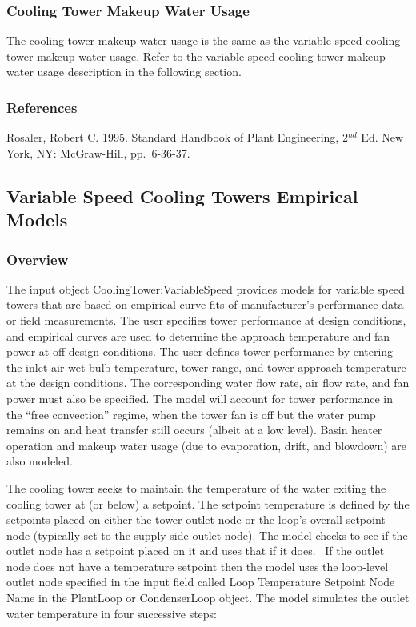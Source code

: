 \subsubsection{Cooling Tower Makeup Water Usage}\label{cooling-tower-makeup-water-usage}

The cooling tower makeup water usage is the same as the variable speed cooling tower makeup water usage. Refer to the variable speed cooling tower makeup water usage description in the following section.

\subsubsection{References}\label{references-015}

Rosaler, Robert C. 1995. Standard Handbook of Plant Engineering, 2\(^{nd}\) Ed. New York, NY: McGraw-Hill, pp.~6-36-37.

\subsection{Variable Speed Cooling Towers Empirical Models}\label{variable-speed-cooling-towers-empirical-models}

\subsubsection{Overview}\label{overview-1-005}

The input object CoolingTower:VariableSpeed provides models for variable speed towers that are based on empirical curve fits of manufacturer's performance data or field measurements. The user specifies tower performance at design conditions, and empirical curves are used to determine the approach temperature and fan power at off-design conditions. The user defines tower performance by entering the inlet air wet-bulb temperature, tower range, and tower approach temperature at the design conditions. The corresponding water flow rate, air flow rate, and fan power must also be specified. The model will account for tower performance in the ``free convection'' regime, when the tower fan is off but the water pump remains on and heat transfer still occurs (albeit at a low level). Basin heater operation and makeup water usage (due to evaporation, drift, and blowdown) are also modeled.

The cooling tower seeks to maintain the temperature of the water exiting the cooling tower at (or below) a setpoint. The setpoint temperature is defined by the setpoints placed on either the tower outlet node or the loop's overall setpoint node (typically set to the supply side outlet node). The model checks to see if the outlet node has a setpoint placed on it and uses that if it does.~ If the outlet node does not have a temperature setpoint then the model uses the loop-level outlet node specified in the input field called Loop Temperature Setpoint Node Name in the PlantLoop or CondenserLoop object. The model simulates the outlet water temperature in four successive steps:

